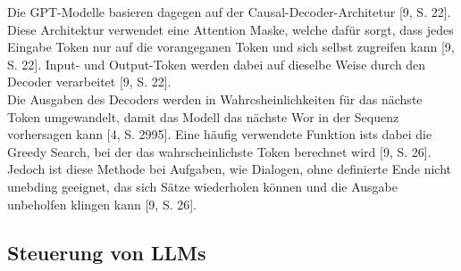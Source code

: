 Die GPT-Modelle basieren dagegen auf der Causal-Decoder-Architetur [9, S. 22]. Diese Architektur verwendet eine Attention Maske, welche dafür sorgt, dass jedes 
Eingabe Token nur auf die vorangeganen Token und sich selbst zugreifen kann [9, S. 22]. Input- und Output-Token werden dabei auf dieselbe Weise durch den Decoder
verarbeitet [9, S. 22]. \\
Die Ausgaben des Decoders werden in Wahrcsheinlichkeiten für das nächste Token umgewandelt, damit das Modell das nächste Wor in der Sequenz vorhersagen kann [4, S. 2995].
Eine häufig verwendete Funktion ists dabei die Greedy Search, bei der das wahrscheinlichste Token berechnet wird [9, S. 26]. Jedoch ist diese Methode bei Aufgaben,
wie Dialogen, ohne definierte Ende nicht unebding geeignet, das sich Sätze wiederholen können und die Ausgabe unbeholfen klingen kann [9, S. 26].

\subsection{Steuerung von LLMs}

